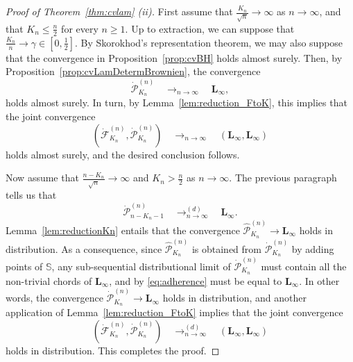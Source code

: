 \documentclass[10pt]{amsart}
\theoremstyle{definition}\newtheorem{defi}[theo]{Definition}\newtheorem{rema}[theo]{Remark}\newtheorem{exam}[theo]{Example}\newtheorem{exem}[theo]{Example}\newtheorem{nota}[theo]{Notation}
\def\S{\mathbb{S}}
\def\dFKn{\dot{\mathcal{F}}^{(n)}_{K_{n}}}
\def\dPKn{\dot{\mathcal{P}}^{(n)}_{K_{n}}}
\begin{document}
\begin{proof}[Proof of  Theorem~\ref{thm:cvlam} (ii)]
First assume that $\frac{K_{n}}{\sqrt{n}} \rightarrow \infty$ as $n \rightarrow \infty$, and that $K_{n} \leq \frac{n}{2}$ for every $n \geq 1$. Up to extraction, we can suppose that $\tfrac{K_{n}}{n} \rightarrow \gamma \in [0,\tfrac{1}{2}]$. By Skorokhod's representation theorem, we may also suppose that the convergence in  Proposition~\ref{prop:cvBH} holds almost surely. Then, by Proposition~\ref{prop:cvLamDetermBrownien}, the convergence
\[ \dPKn    \quad \mathop{\longrightarrow}_{n \rightarrow \infty} \quad \mathbf{L}_{\infty},\]
holds almost surely. In turn, by Lemma~\ref{lem:reduction_FtoK}, this implies that the joint convergence
 \[ \left( \dFKn , \dPKn \right)   \quad \mathop{\longrightarrow}_{n \rightarrow \infty} \quad ( \mathbf{L}_{\infty},\mathbf{L}_{\infty})\]
holds almost surely, and the desired conclusion follows.

Now assume that $\frac{n-K_{n}}{\sqrt{n}} \rightarrow \infty$ and $K_{n} > \frac{n}{2}$ as $n \rightarrow \infty$.
The previous paragraph tells us that
\[   \dot{\mathcal{P}}^{(n)}_{n-K_{n}-1}  \quad \mathop{\longrightarrow}^{(d)}_{n \rightarrow \infty} \quad \mathbf{L}_{\infty}.\]
Lemma~\ref{lem:reductionKn} entails that the convergence $\hat{\mathcal{P}}^{(n)}_{K_{n}} \rightarrow  \mathbf{L}_{\infty}$ holds in distribution. As a consequence,  since $\hat{\mathcal{P}}^{(n)}_{K_{n}}$ is obtained from  $\dot{\mathcal{P}}^{(n)}_{K_{n}}$ by adding points of $\S$, any sub-sequential distributional limit of $\dot{\mathcal{P}}^{(n)}_{K_{n}}$ must contain all the non-trivial chords of $\mathbf{L}_{\infty}$, and by \eqref{eq:adherence} must be equal to $\mathbf{L}_{\infty}$. In other words, the convergence $\dot{\mathcal{P}}^{(n)}_{K_{n}} \rightarrow  \mathbf{L}_{\infty}$ holds in distribution, and  another application of Lemma~\ref{lem:reduction_FtoK} implies that  the joint convergence
 \[ \left( \dFKn,   \dPKn \right)   \quad \mathop{\longrightarrow}^{(d)}_{n \rightarrow \infty} \quad ( \mathbf{L}_{\infty},\mathbf{L}_{\infty})\]
holds in distribution. This completes the proof.
\end{proof}
\end{document}
